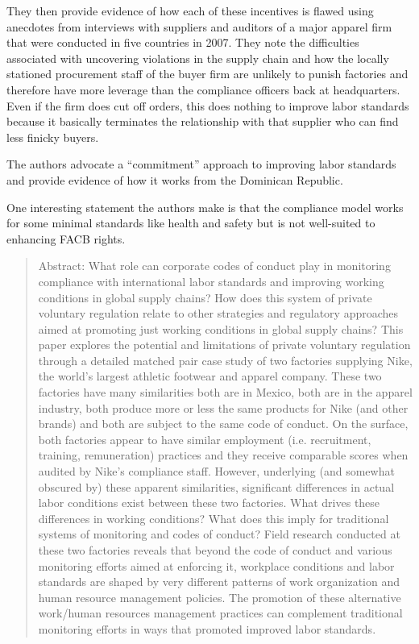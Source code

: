 \documentclass[
  12pt,
]{article}
\begin{document}
They then provide evidence of how each of these incentives is flawed
using anecdotes from interviews with suppliers and auditors of a major
apparel firm that were conducted in five countries in 2007. They note
the difficulties associated with uncovering violations in the supply
chain and how the locally stationed procurement staff of the buyer firm
are unlikely to punish factories and therefore have more leverage than
the compliance officers back at headquarters. Even if the firm does cut
off orders, this does nothing to improve labor standards because it
basically terminates the relationship with that supplier who can find
less finicky buyers.

The authors advocate a ``commitment'' approach to improving labor
standards and provide evidence of how it works from the Dominican
Republic.

One interesting statement the authors make is that the compliance model
works for some minimal standards like health and safety but is not
well-suited to enhancing FACB rights.

\bigbreak


\begin{quote}
Abstract: 
What role can corporate codes of conduct play in monitoring compliance with international labor standards and improving working conditions in global supply chains? How does this system of private voluntary regulation relate to other strategies and regulatory approaches aimed at promoting just working conditions in global supply chains? This paper explores the potential and limitations of private voluntary regulation through a detailed matched pair case study of two factories supplying Nike, the world's largest athletic footwear and apparel company. These two factories have many similarities \textendash{} both are in Mexico, both are in the apparel industry, both produce more or less the same products for Nike (and other brands) and both are subject to the same code of conduct. On the surface, both factories appear to have similar employment (i.e. recruitment, training, remuneration) practices and they receive comparable scores when audited by Nike's compliance staff. However, underlying (and somewhat obscured by) these apparent similarities, significant differences in actual labor conditions exist between these two factories. What drives these differences in working conditions? What does this imply for traditional systems of monitoring and codes of conduct? Field research conducted at these two factories reveals that beyond the code of conduct and various monitoring efforts aimed at enforcing it, workplace conditions and labor standards are shaped by very different patterns of work organization and human resource management policies. The promotion of these alternative work/human resources management practices can complement traditional monitoring efforts in ways that promoted improved labor standards.
\end{quote}
\end{document}
